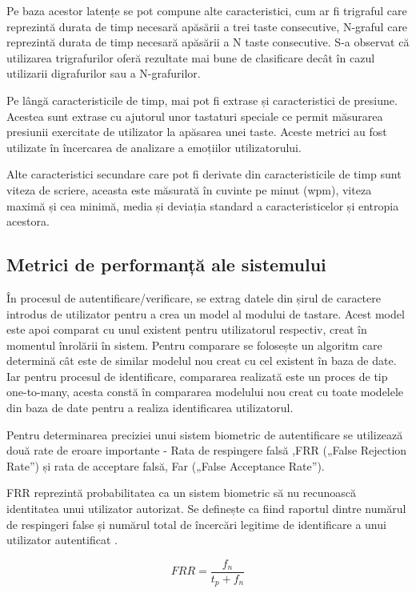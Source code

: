 \documentclass[9pt,shortpaper,twoside,web]{ieeecolor}
\begin{document}
	Pe baza acestor latențe se pot compune alte caracteristici, cum ar fi trigraful care reprezintă durata de timp necesară apăsării a trei taste consecutive, N-graful care reprezintă durata de timp necesară apăsării a N taste consecutive. S-a observat că utilizarea trigrafurilor oferă rezultate mai bune de clasificare decât în cazul utilizarii digrafurilor sau a N-grafurilor. 
		
	Pe lângă caracteristicile de timp, mai pot fi extrase și caracteristici de presiune. Acestea sunt extrase cu ajutorul unor tastaturi speciale ce permit măsurarea presiunii exercitate de utilizator la apăsarea unei taste. Aceste metrici au fost utilizate în încercarea de analizare a emoțiilor utilizatorului.

	Alte caracteristici secundare care pot fi derivate din caracteristicile de timp sunt viteza de scriere, aceasta este măsurată în cuvinte pe minut (wpm), viteza maximă și cea minimă, media și deviația standard a caracteristicelor și entropia acestora.
	

\subsection{Metrici de performanță ale sistemului}
	În procesul de autentificare/verificare, se extrag datele din șirul de caractere introdus de utilizator pentru a crea un model al modului de tastare. Acest model este apoi comparat cu unul existent pentru utilizatorul respectiv, creat în momentul înrolării în sistem. Pentru comparare se folosește un algoritm care determină cât este de similar modelul nou creat cu cel existent în baza de date. Iar pentru procesul de identificare, compararea realizată este un proces de tip one-to-many, acesta constă în compararea modelului nou creat cu toate modelele din baza de date pentru a realiza identificarea utilizatorul.
	
	Pentru determinarea preciziei unui sistem biometric de autentificare se utilizează două rate de eroare importante - Rata de respingere falsă ,FRR („False Rejection Rate”) și rata de acceptare falsă, Far („False Acceptance Rate”).


FRR reprezintă probabilitatea ca un sistem biometric să nu recunoască identitatea unui utilizator autorizat. Se definește ca fiind raportul dintre numărul de respingeri false și numărul total de încercări legitime de identificare a unui utilizator autentificat \cite{b7}.

\begin{equation} \label{eq1}
FRR = \frac{f_n}{t_p + f_n}
\end{equation}
\end{document}
